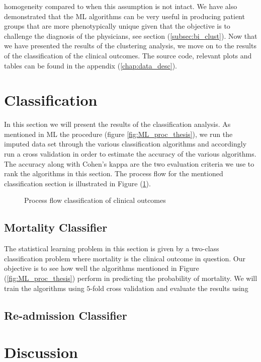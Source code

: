 \documentclass[../thesis.tex]{subfiles}
\begin{document}
homogeneity compared to when this assumption is not intact. We have also demonstrated that the ML algorithms can be very useful in producing patient groups that are more phenotypically unique given that the objective is to challenge the diagnosis of the physicians, see section (\ref{subsec:bi_clust}). Now that we have presented the results of the clustering analysis, we move on to the results of the classification of the clinical outcomes. The source code, relevant plots and tables can be found in the appendix (\ref{chap:data_desc}).

\section{Classification}

\noindent In this section we will present the results of the classification analysis. As mentioned in ML the procedure (figure \ref{fig:ML_proc_thesis}), we run the imputed data set through the various classification algorithms and accordingly run a cross validation in order to estimate the accuracy of the various algorithms. The accuracy along with Cohen’s kappa are the two evaluation criteria we use to rank the algorithms in this section. The process flow for the mentioned classification section is illustrated in Figure (\ref{fig:process_flow_classification}). 

\begin{figure}
    \centering
    
    \caption{Process flow classification of clinical outcomes}
    \label{fig:process_flow_classification}
\end{figure}

\subsection{Mortality Classifier}

\noindent The statistical learning problem in this section is given by a two-class classification problem where mortality is the clinical outcome in question. Our objective is to see how well the algorithms mentioned in Figure (\ref{fig:ML_proc_thesis}) perform in predicting the probability of mortality. We will train the algorithms using $5$-fold cross validation and evaluate the results using 

\subsection{Re-admission Classifier}

\section{Discussion}
\end{document}
